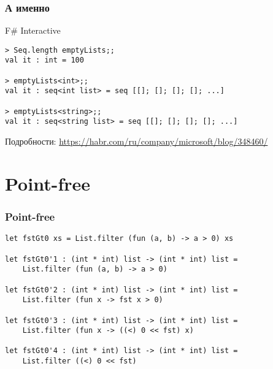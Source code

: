 \documentclass[xetex,mathserif,serif]{beamer}
\begin{document}
    \begin{frame}[fragile]
        \frametitle{А именно}
        \begin{alertblock}{F\# Interactive}
            \begin{verbatim}
> Seq.length emptyLists;;
val it : int = 100

> emptyLists<int>;;
val it : seq<int list> = seq [[]; []; []; []; ...]

> emptyLists<string>;;
val it : seq<string list> = seq [[]; []; []; []; ...]
            \end{verbatim}
        \end{alertblock}
        Подробности: \url{https://habr.com/ru/company/microsoft/blog/348460/}
    \end{frame}

    \section{Point-free}
    
    \begin{frame}[fragile]
        \frametitle{Point-free}
        \begin{verbatim}
let fstGt0 xs = List.filter (fun (a, b) -> a > 0) xs

let fstGt0'1 : (int * int) list -> (int * int) list = 
    List.filter (fun (a, b) -> a > 0)

let fstGt0'2 : (int * int) list -> (int * int) list = 
    List.filter (fun x -> fst x > 0)

let fstGt0'3 : (int * int) list -> (int * int) list = 
    List.filter (fun x -> ((<) 0 << fst) x)

let fstGt0'4 : (int * int) list -> (int * int) list = 
    List.filter ((<) 0 << fst)
        \end{verbatim}
    \end{frame}
\end{document}
